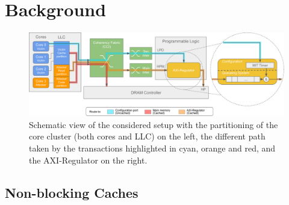 \section{Background}
    \begin{figure}
        \centering
        \includegraphics[scale=0.56]{images/Evaluation_setup.pdf}
        \caption{Schematic view of the considered setup with the partitioning of the core cluster (both cores and LLC) on the left, the different path taken by the transactions highlighted in cyan, orange and red, and the AXI-Regulator on the right.}
        \label{fig:system_schematic}
    \end{figure}
    \subsection{Non-blocking Caches}
%

